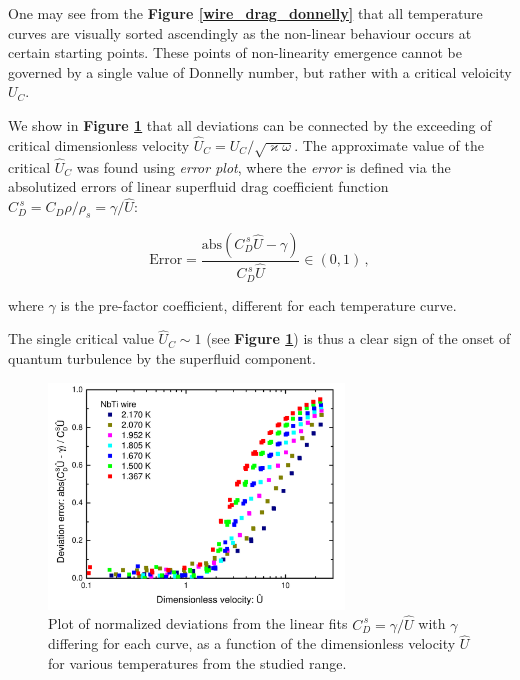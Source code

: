 One may see from the \textbf{Figure \ref{wire_drag_donnelly}} that all temperature curves are visually sorted ascendingly as the non-linear behaviour occurs at certain starting points. These points of non-linearity emergence cannot be governed by a single value of Donnelly number, but rather with a critical veloicity $U_C$.

We show in \textbf{Figure \ref{wire_nonlinear_drag}} that all deviations can be connected by the exceeding of critical dimensionless velocity $\hat{U}_C = U_C / \sqrt{\varkappa \omega}$. The approximate value of the critical $\hat{U}_C$ was found using \textit{error plot}, where the \textit{error} is defined via the absolutized errors of linear superfluid drag coefficient function $C_D^{\, s} = C_D \rho / \rho_s = \gamma / \hat{U}$:

\begin{equation}
\text{Error} = \frac{\text{abs}(C_D^{\,s} \hat{U} - \gamma)}{C_D^{\,s} \hat{U}} \in (0,1)\,,
\end{equation}

where $\gamma$ is the pre-factor coefficient, different for each temperature curve.

The single critical value $\hat{U}_C \sim 1$ (see \textbf{Figure \ref{wire_nonlinear_drag}}) is thus a clear sign of the onset of quantum turbulence by the superfluid component.

\begin{figure}[h]
	\centering
	\includegraphics[width=0.7\textwidth]{graphics/results/wire_nonlinear_drag}
	\caption{Plot of normalized deviations from the linear fits $C_D^{\,s} =  \gamma / \hat{U}$ with $\gamma$ differing for each curve, as a function of the dimensionless velocity $\hat{U}$ for various temperatures from the studied range.}
	\label{wire_nonlinear_drag}
\end{figure}


